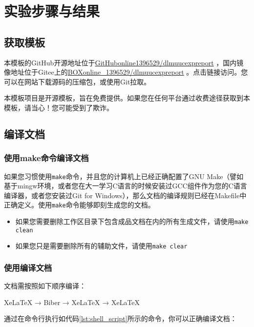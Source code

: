 \chapter{实验步骤与结果}

\section{获取模板}

本模板的GitHub开源地址位于\href{https://github.com/GitHubonline1396529/dlmuucexpreport}{GitHubonline1396529/dlmuucexpreport} ，国内镜像地址位于Gitee上的\href{https://gitee.com/BOXonline_1396529/dlmuucexpreport}{BOXonline\_1396529/dlmuucexpreport} 。点击链接访问。您可以在网站下载源码的压缩包，或使用Git拉取。

本模板项目是开源模板，旨在免费提供。如果您在任何平台通过收费途径获取到本模板，请当心！您可能受到了欺诈。

\section{编译文档}

\subsection{使用make命令编译文档}

如果您习惯使用\texttt{make}命令，并且您的计算机上已经正确配置了GNU Make（譬如基于mingw环境，或者您在大一学习C语言的时候安装过GCC组件作为您的C语言编译器，或者您安装过Git for Windows），那么文档的编译规则已经在Makefile中正确定义。使用\texttt{make}命令能够即刻生成您的文档。

\begin{itemize}
    \item 如果您需要删除工作区目录下包含成品文档在内的所有生成文件，请使用\texttt{make clean}
    \item 如果您只是需要删除所有的辅助文件，请使用\texttt{make clear}
\end{itemize}

\subsection{使用\XeLaTeX 编译文档}

文档需按照如下顺序编译：

XeLaTeX → Biber → XeLaTeX → XeLaTeX

通过在命令行执行如代码\ref{lst:shell_script}所示的命令，你可以正确编译文档：

